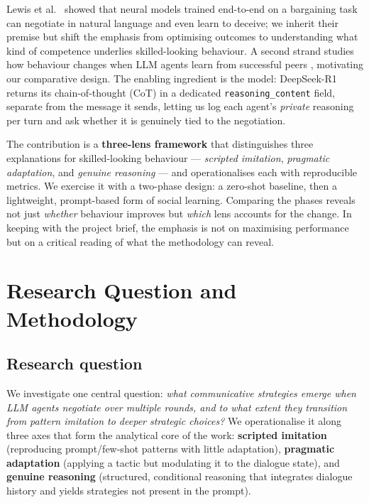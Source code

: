 \documentclass[pdflatex,sn-mathphys-num]{sn-jnl}%
\theoremstyle{thmstyleone}%
\theoremstyle{thmstyletwo}%
\theoremstyle{thmstylethree}%
\begin{document}
Lewis et al.\ \cite{lewis2017} showed that neural models trained end-to-end on a bargaining task can negotiate in natural language and even learn to deceive; we inherit their premise but shift the emphasis from optimising outcomes to understanding what kind of competence underlies skilled-looking behaviour. A second strand studies how behaviour changes when LLM agents learn from successful peers \cite{gupta2025}, motivating our comparative design. The enabling ingredient is the model: DeepSeek-R1 \cite{deepseekr1} returns its chain-of-thought (CoT) in a dedicated \texttt{reasoning\_content} field, separate from the message it sends, letting us log each agent's \emph{private} reasoning per turn and ask whether it is genuinely tied to the negotiation.

The contribution is a \textbf{three-lens framework} that distinguishes three explanations for skilled-looking behaviour --- \emph{scripted imitation}, \emph{pragmatic adaptation}, and \emph{genuine reasoning} --- and operationalises each with reproducible metrics. We exercise it with a two-phase design: a zero-shot baseline, then a lightweight, prompt-based form of social learning. Comparing the phases reveals not just \emph{whether} behaviour improves but \emph{which} lens accounts for the change. In keeping with the project brief, the emphasis is not on maximising performance but on a critical reading of what the methodology can reveal.

\section{Research Question and Methodology}\label{sec:method}

\subsection{Research question}\label{subsec:rq}

We investigate one central question: \emph{what communicative strategies emerge when LLM agents negotiate over multiple rounds, and to what extent they transition from pattern imitation to deeper strategic choices?} We operationalise it along three axes that form the analytical core of the work: \textbf{scripted imitation} (reproducing prompt/few-shot patterns with little adaptation), \textbf{pragmatic adaptation} (applying a tactic but modulating it to the dialogue state), and \textbf{genuine reasoning} (structured, conditional reasoning that integrates dialogue history and yields strategies not present in the prompt).
\end{document}

